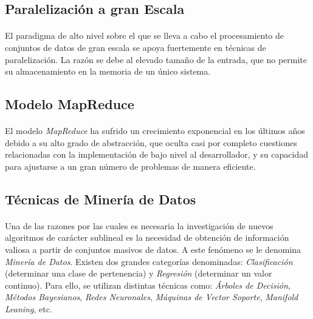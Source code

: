 \documentclass{subfiles}
\begin{document}
      \subsection{Paralelización a gran Escala}

        \paragraph{}
        El paradigma de alto nivel sobre el que se lleva a cabo el procesamiento de conjuntos de datos de gran escala se apoya fuertemente en técnicas de paralelización. La razón se debe al elevado tamaño de la entrada, que no permite su almacenamiento en la memoria de un único sistema.

        \subsection{Modelo MapReduce}

          \paragraph{}
          El modelo \emph{MapReduce} ha sufrido un crecimiento exponencial en los últimos años debido a su alto grado de abstracción, que oculta casi por completo cuestiones relacionadas con la implementación de bajo nivel al desarrollador, y su capacidad para ajustarse a un gran número de problemas de manera eficiente.

      \subsection{Técnicas de Minería de Datos}

        \paragraph{}
        Una de las razones por las cuales es necesaria la investigación de nuevos algoritmos de carácter sublineal es la necesidad de obtención de información valiosa a partir de conjuntos masivos de datos. A este fenómeno se le denomina \emph{Minería de Datos}. Existen dos grandes categorías denominadas: \emph{Clasificación} (determinar una clase de pertenencia) y \emph{Regresión} (determinar un valor continuo). Para ello, se utilizan distintas técnicas como: \emph{Árboles de Decisión}, \emph{Métodos Bayesianos}, \emph{Redes Neuronales}, \emph{Máquinas de Vector Soporte}, \emph{Manifold Leaning}, etc.
\end{document}

